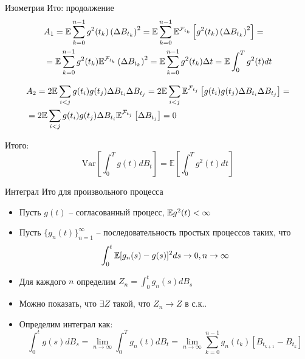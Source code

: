 \documentclass[aspectratio=169]{beamer}
\begin{document}
\begin{frame}{Изометрия Ито: продолжение}
    \begin{align*}
        &A_1 = \mathbb{E} \sum_{k=0}^{n-1} g^2(t_k) \left(\Delta B_{t_k}\right)^2 = 
        \mathbb{E} \sum_{k=0}^{n-1} \mathbb{E}^{\mathcal{F}_{t_k}} \left[g^2(t_k) \left(\Delta B_{t_k}\right)^2 \right] 
        = \\ 
        & = \mathbb{E} \sum_{k=0}^{n-1} g^2(t_k) \mathbb{E}^{\mathcal{F}_{t_k}} \left(\Delta B_{t_k}\right)^2 = \mathbb{E} \sum_{k=0}^{n-1} g^2(t_k) \Delta t = \mathbb{E} \int_0^T g^2(t) dt 
    \end{align*}
     
    \begin{align*}
        &A_2 = 2 \mathbb{E} \sum_{i < j} g(t_i)g(t_j) \Delta B_{t_i} \Delta B_{t_j} =
        2 \mathbb{E} \sum_{i < j} \mathbb{E}^{\mathcal{F}_{t_j}} \left[g(t_i)g(t_j) \Delta B_{t_i} \Delta B_{t_j}\right] = \\
        &= 2 \mathbb{E} \sum_{i < j} g(t_i)g(t_j) \Delta B_{t_i} \mathbb{E}^{\mathcal{F}_{t_j}} \left[ \Delta B_{t_j}\right] = 0
    \end{align*}
     
    Итого:
    $$ \mathrm{Var} \left[ \int_0^T g(t) dB_t \right] = \mathbb{E} \left[\int_0^T g^2(t) dt\right]$$
\end{frame}


\begin{frame}{Интеграл Ито для произвольного процесса}
    \begin{itemize}
        \item Пусть $g(t)$ -- согласованный процесс, $\mathbb{E} g^2(t) < \infty$
        \item Пусть $\{g_n(t)\}_{n=1}^{\infty}$ -- последовательность простых процессов таких, что 
        $$
            \int_0^t \mathbb{E} [g_n(s)-g(s)]^2 ds \to 0, n \to \infty
        $$
        \item Для каждого $n$ определим $Z_n = \int_0^t g_n(s)dB_s$

        \item Можно показать, что $\exists Z$ такой, что $Z_n \to Z$ в с.к.. 
        
        \item Определим интеграл как:
        $$
            \int_0^t g(s)dB_s =  \lim_{n\to \infty}\int_0^T g_n(t) dB_t = \lim_{n \to \infty} \sum_{k=0}^{n-1} g_n(t_k)\left[B_{t_{k+1}} - B_{t_k}\right]
        $$
    \end{itemize}
\end{frame}
\end{document}
